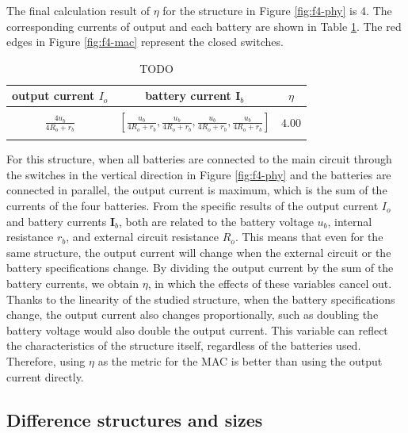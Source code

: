 \documentclass{article}
\begin{document}
The final calculation result of $\eta$ for the structure in Figure \ref{fig:f4-phy} is 4. 
The corresponding currents of output and each battery are shown in Table \ref{tab:1}. 
The red edges in Figure \ref{fig:f4-mac} represent the closed switches.
\begin{table}[h]
    \caption{TODO}
    \label{tab:1}
    \begin{tabular}{ccc}
        \hline
        output current $I_o$       & battery current $\bm{I}_b$       & $\eta$        \\ 
        \hline\\
        $\displaystyle\frac{4u_b}{4R_o + r_b}$ &  $\displaystyle\left[\frac{u_b}{4R_o + r_b},\frac{u_b}{4R_o + r_b},\frac{u_b}{4R_o + r_b},\frac{u_b}{4R_o + r_b}\right]$   & $4.00$ \\ 
        \\
        \hline
    \end{tabular}
\end{table}
For this structure, when all batteries are connected to the main circuit through the switches in the vertical direction in Figure \ref{fig:f4-phy} and the batteries are connected in parallel, the output current is maximum, which is the sum of the currents of the four batteries. 
From the specific results of the output current $I_o$ and battery currents $\bm{I}_b$, both are related to the battery voltage $u_b$, internal resistance $r_b$, and external circuit resistance $R_o$. 
This means that even for the same structure, the output current will change when the external circuit  or the battery specifications  change. 
By dividing the output current by the sum of the battery currents, we obtain $\eta$, in which the effects of these variables cancel out.
Thanks to the linearity of the studied structure, when the battery specifications change, the output current also changes proportionally, such as doubling the battery voltage would also double the output current. 
This variable can reflect the characteristics of the structure itself, regardless of the batteries used. 
Therefore, using $\eta$ as the metric for the MAC is better than using the output current directly.

\subsection{Difference structures and sizes}
\end{document}
